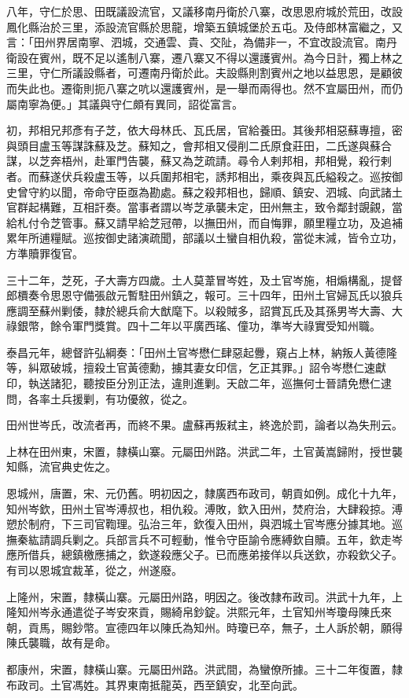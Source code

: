 \begin{pinyinscope}
八年，守仁於思、田既議設流官，又議移南丹衛於八寨，改思恩府城於荒田，改設鳳化縣治於三里，添設流官縣於思龍，增築五鎮城堡於五屯。及侍郎林富繼之，又言：「田州界居南寧、泗城，交通雲、貴、交阯，為備非一，不宜改設流官。南丹衛設在賓州，既不足以遙制八寨，遷八寨又不得以還護賓州。為今日計，獨上林之三里，守仁所議設縣者，可遷南丹衛於此。夫設縣則割賓州之地以益思恩，是顧彼而失此也。遷衛則扼八寨之吭以還護賓州，是一舉而兩得也。然不宜屬田州，而仍屬南寧為便。」其議與守仁頗有異同，詔從富言。

初，邦相兄邦彥有子芝，依大母林氏、瓦氏居，官給養田。其後邦相惡蘇專擅，密與頭目盧玉等謀誅蘇及芝。蘇知之，會邦相又侵削二氏原食莊田，二氏遂與蘇合謀，以芝奔梧州，赴軍門告襲，蘇又為芝疏請。尋令人剌邦相，邦相覺，殺行剌者。而蘇遂伏兵殺盧玉等，以兵圍邦相宅，誘邦相出，乘夜與瓦氏縊殺之。巡按御史曾守約以聞，帝命守臣亟為勘處。蘇之殺邦相也，歸順、鎮安、泗城、向武諸土官群起構難，互相訐奏。當事者謂以岑芝承襲未定，田州無主，致令鄰封覬覦，當給札付令芝管事。蘇又請早給芝冠帶，以撫田州，而自悔罪，願里糧立功，及追補累年所逋糧賦。巡按御史諸演疏聞，部議以土蠻自相仇殺，當從末減，皆令立功，方準贖罪復官。

三十二年，芝死，子大壽方四歲。土人莫葦冒岑姓，及土官岑施，相煽構亂，提督郎檟奏令思恩守備張啟元暫駐田州鎮之，報可。三十四年，田州土官婦瓦氏以狼兵應調至蘇州剿倭，隸於總兵俞大猷麾下。以殺賊多，詔賞瓦氏及其孫男岑大壽、大祿銀幣，餘令軍門獎賞。四十二年以平廣西瑤、僮功，準岑大祿實受知州職。

泰昌元年，總督許弘綱奏：「田州土官岑懋仁肆惡起釁，窺占上林，納叛人黃德隆等，糾眾破城，擅殺土官黃德勳，擄其妻女印信，乞正其罪。」詔令岑懋仁速獻印，執送諸犯，聽按臣分別正法，違則進剿。天啟二年，巡撫何士晉請免懋仁逮問，各率土兵援剿，有功優敘，從之。

田州世岑氏，改流者再，而終不果。盧蘇再叛弒主，終逸於罰，論者以為失刑云。

上林在田州東，宋置，隸橫山寨。元屬田州路。洪武二年，土官黃嵩歸附，授世襲知縣，流官典史佐之。

恩城州，唐置，宋、元仍舊。明初因之，隸廣西布政司，朝貢如例。成化十九年，知州岑欽，田州土官岑溥叔也，相仇殺。溥敗，欽入田州，焚府治，大肆殺掠。溥愬於制府，下三司官鞫理。弘治三年，欽復入田州，與泗城土官岑應分據其地。巡撫秦紘請調兵剿之。兵部言兵不可輕動，惟令守臣諭令應縛欽自贖。五年，欽走岑應所借兵，總鎮檄應捕之，欽遂殺應父子。已而應弟接佯以兵送欽，亦殺欽父子。有司以恩城宜裁革，從之，州遂廢。

上隆州，宋置，隸橫山寨。元屬田州路，明因之。後改隸布政司。洪武十九年，上隆知州岑永通遣從子岑安來貢，賜綺帛鈔錠。洪熙元年，土官知州岑瓊母陳氏來朝，貢馬，賜鈔幣。宣德四年以陳氏為知州。時瓊已卒，無子，土人訴於朝，願得陳氏襲職，故有是命。

都康州，宋置，隸橫山寨。元屬田州路。洪武間，為蠻僚所據。三十二年復置，隸布政司。土官馮姓。其界東南抵龍英，西至鎮安，北至向武。


\end{pinyinscope}